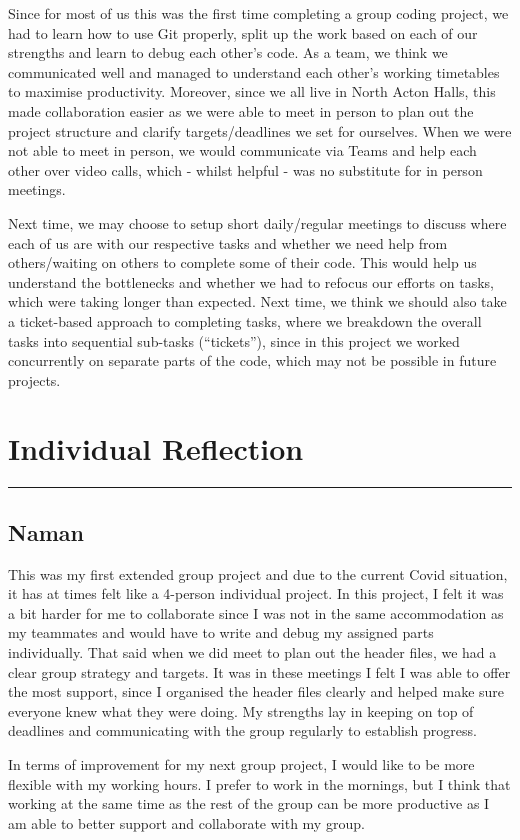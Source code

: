 \documentclass{article}
\begin{document}
Since for most of us this was the first time completing a group coding project, we had to learn how to use Git properly, split up the work based on each of our strengths and learn to debug each other’s code. As a team, we think we communicated well and managed to understand each other’s working timetables to maximise productivity.  Moreover, since we all live in North Acton Halls, this made collaboration easier as we were able to meet in person to plan out the project structure and clarify targets/deadlines we set for ourselves. When we were not able to meet in person, we would communicate via Teams and help each other over video calls, which - whilst helpful - was no substitute for in person meetings. \\ \par \noindent
Next time, we may choose to setup short daily/regular meetings to discuss where each of us are with our respective tasks and whether we need help from others/waiting on others to complete some of their code. This would help us understand the bottlenecks and whether we had to refocus our efforts on tasks, which were taking longer than expected. Next time, we think we should also take a ticket-based approach to completing tasks, where we breakdown the overall tasks into sequential sub-tasks (“tickets”), since in this project we worked concurrently on separate parts of the code, which may not be possible in future projects.


\section{Individual Reflection}
\rule{\textwidth}{0.05em}
\vspace{0.1em}

\subsection{Naman} 

This was my first extended group project and due to the current Covid situation, it has at times felt like a 4-person individual project. In this project, I felt it was a bit harder for me to collaborate since I was not in the same accommodation as my teammates and would have to write and debug my assigned parts individually. That said when we did meet to plan out the header files, we had a clear group strategy and targets. It was in these meetings I felt I was able to offer the most support, since I organised the header files clearly and helped make sure everyone knew what they were doing. My strengths lay in keeping on top of deadlines and communicating with the group regularly to establish progress. \\ \par \noindent
In terms of improvement for my next group project, I would like to be more flexible with my working hours. I prefer to work in the mornings, but I think that working at the same time as the rest of the group can be more productive as I am able to better support and collaborate with my group.
\end{document}
